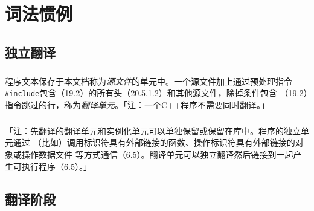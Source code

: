 \chapter{词法惯例}

\section{独立翻译}

\paragraph{}
程序文本保存于本文档称为\textit{源文件}的单元中。一个源文件加上通过预处理指令
\texttt{\#include}包含（19.2）的所有头（20.5.1.2）和其他源文件，除掉条件包含
（19.2）指令跳过的行，称为\textit{翻译单元}。「注：一个C++程序不需要同时翻译。」

\paragraph{}
「注：先翻译的翻译单元和实例化单元可以单独保留或保留在库中。程序的独立单元通过
（比如）调用标识符具有外部链接的函数、操作标识符具有外部链接的对象或操作数据文件
等方式通信（6.5）。翻译单元可以独立翻译然后链接到一起产生可执行程序（6.5）。」

\section{翻译阶段}

